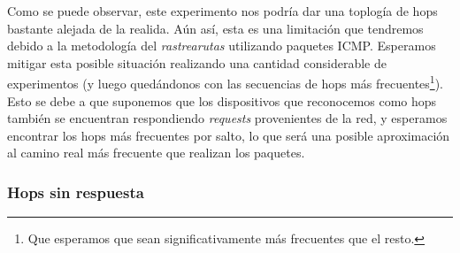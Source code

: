\par Como se puede observar, este experimento nos podr\'ia dar una toplog\'ia
de hops bastante alejada de la realida. A\'un as\'i, esta es una limitaci\'on
que tendremos debido a la metodolog\'ia del \textit{rastrearutas} utilizando
paquetes ICMP. Esperamos mitigar esta posible situaci\'on realizando una
cantidad considerable de experimentos (y luego qued\'andonos con
las secuencias de hops m\'as frecuentes\footnote{Que esperamos que sean
significativamente m\'as frecuentes que el resto.}). Esto se debe a que suponemos
que los dispositivos que reconocemos como hops tambi\'en se encuentran
respondiendo \textit{requests} provenientes de la red, y esperamos encontrar
los hops m\'as frecuentes por salto, lo que ser\'a una posible aproximaci\'on
al camino real m\'as frecuente que realizan los paquetes.

\subsubsection*{Hops sin respuesta}
